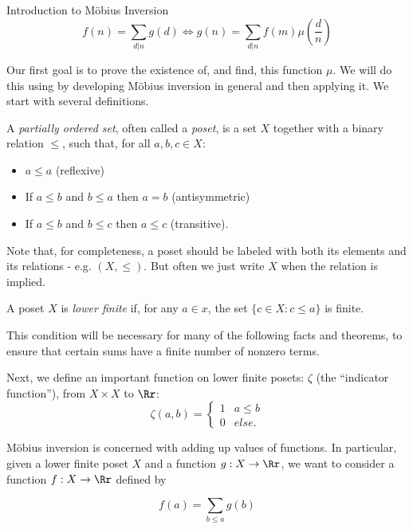 \documentclass[12pt]{pom_thesis}
\begin{document}
\begin{chapter}{Introduction to M\"obius Inversion}
\begin{equation}\label{init_mob} 
f(n) = \sum_{d | n} g(d) \iff g(n) = \sum_{d | n}  f(m)\mu\left(\frac dn\right)
\end{equation}

Our first goal is to prove the existence of, and find, this function $\mu$. We will do this using by developing M\"obius inversion in general and then applying it. We start with several definitions.

\begin{defn}
A \emph{partially ordered set}, often called a \emph{poset}, is a set $X$ together with a binary relation $\leq$, such that, for all $a,b,c \in X$:
\begin{itemize}
\item $a \leq a$ (reflexive)
\item If $a \leq b$ and $b \leq a$ then $a = b$ (antisymmetric)
\item If $a \leq b$ and $b \leq c$ then $a \leq c$ (transitive).
\end{itemize}
\end{defn}
Note that, for completeness, a poset should be labeled with both its elements and its relations - e.g. $(X, \leq)$. But often we just write $X$ when the relation is implied.
\begin{defn}
A poset $X$ is \emph{lower finite} if, for any $a \in x$, the set $\{ c \in X: c \leq a\}$ is finite.
\end{defn}
This condition will be necessary for many of the following facts and theorems, to ensure that certain sums have a finite number of nonzero terms.

Next, we define an important function on lower finite posets: $\zeta$ (the ``indicator function''), from $X \times X$ to $\Rr$:
\[
\zeta(a,b) = \begin{cases} 1 & a \leq b \\ 0 & else. \end{cases}
\]

M\"obius inversion is concerned with adding up values of functions. In particular, given a lower finite poset $X$ and a function $g:X \rightarrow \Rr$, we want to consider a function $f:X \rightarrow \Rr$ defined by

\[
f(a) = \sum_{b \leq a}g(b)
\]


\end{chapter}
\end{document}
